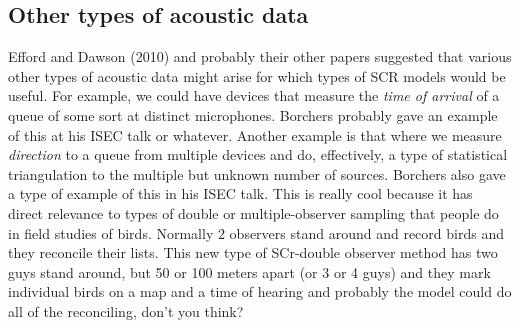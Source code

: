 \subsection{Other types of acoustic data}


Efford and Dawson (2010) and probably their other papers suggested
that various other types of acoustic data might arise for which
types of SCR models would be useful.
For example, we could have devices that measure the {\it time of
  arrival} of a queue of some sort at distinct microphones.  
Borchers probably gave an example of this at his ISEC talk or
whatever.
Another example is that where we measure {\it direction} to a queue
from multiple devices and do, effectively, a type of statistical
triangulation to the multiple but unknown number of sources. Borchers
also gave a type of example of this in his ISEC talk. This is really
cool because it has direct relevance to types of double or
multiple-observer sampling that people do in field studies of
birds. Normally 2 observers stand around and record birds and they
reconcile their lists. This new type of SCr-double observer method has
two guys stand around, but 50 or 100 meters apart (or 3 or 4 guys) and
they mark individual birds on a map and a time of hearing and probably
the model could do all of the reconciling, don't you think?
